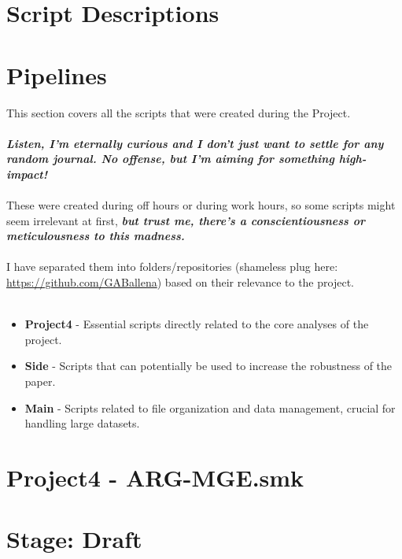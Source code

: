 \documentclass[11pt]{article}
\begin{document}
\newpage
\onecolumn

\newpage
\onecolumn

\section*{\centering \huge \textbf{Script Descriptions}}  %

\section*{Pipelines}  %
This section covers all the scripts that were created during the Project.
\\
\\
\textit{\textbf{Listen, I’m eternally curious and I don't just want to settle for any random journal. No offense, but I’m aiming for something high-impact!}} 
\\
\\
These were created during off hours or during work hours, so some scripts might seem irrelevant at first, \textbf{\textit{but trust me, there's a conscientiousness or meticulousness to this madness.}}
\\
\\
I have separated them into folders/repositories (shameless plug here: \href{https://github.com/GABallena}{https://github.com/GABallena}) based on their relevance to the project.
\\
\\
\begin{itemize}
	\item \textbf{Project4} - Essential scripts directly related to the core analyses of the project.
	\item \textbf{Side} - Scripts that can potentially be used to increase the robustness of the paper.
	\item \textbf{Main} - Scripts related to file organization and data management, crucial for handling large datasets.
\end{itemize}



\newpage
\setcounter{section}{1}
\setcounter{subsection}{0}
\section*{Project4 - ARG-MGE.smk}
\section*{Stage: Draft}   
\end{document}

